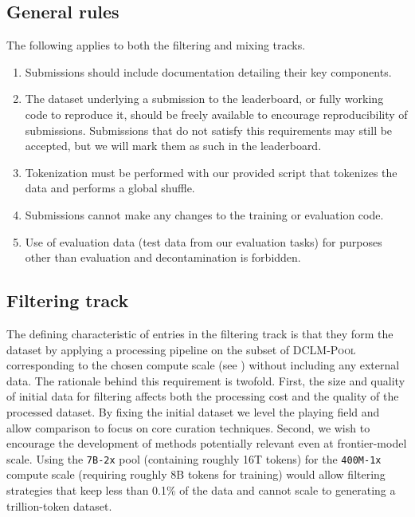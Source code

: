 \documentclass{article}
\newcommand{\rawpool}{\textsc{DCLM-Pool}\xspace}
\newcommand{\xstrack}{\texttt{400M-1x}\xspace}
\newcommand{\xltrack}{\texttt{7B-2x}\xspace}
\begin{document}
\subsection{General rules}
The following applies to both the filtering and mixing tracks.
\begin{enumerate}
    \item Submissions should include documentation detailing their key components.

    \item The dataset underlying a submission to the leaderboard, or fully working code to reproduce it, should be freely available to encourage reproducibility of submissions.
    Submissions that do not satisfy this requirements may still be accepted, but we will mark them as such in the leaderboard.


    \item Tokenization must be performed with our provided script that tokenizes the data and performs a global shuffle.

    \item Submissions cannot make any changes to the training or evaluation code.

    \item Use of evaluation data (test data from our evaluation tasks) for purposes other than evaluation and decontamination is forbidden.
\end{enumerate}

\subsection{Filtering track}

The defining characteristic of entries in the filtering track is that they form the dataset by applying a processing pipeline on the subset of \rawpool corresponding to the chosen compute scale (see ) without including any external data. The rationale behind this requirement is twofold. First, the size and quality of initial data for filtering affects both the processing cost and the quality of the processed dataset. By fixing the initial dataset we level the playing field and allow comparison to focus on core curation techniques.
Second, we wish to encourage the development of methods potentially relevant even at frontier-model scale. Using the \xltrack pool (containing roughly 16T tokens) for the \xstrack compute scale (requiring roughly 8B tokens for training) would allow filtering strategies that keep less than 0.1\% of the data and cannot scale to generating a trillion-token dataset.
\end{document}
